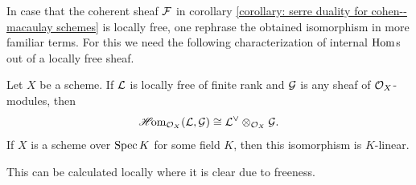 In case that the coherent sheaf ${\mathcal{F}}$ in corollary \ref{corollary: serre duality for cohen--macaulay schemes} is locally free, one rephrase the obtained isomorphism in more familiar terms. For this we need the following characterization of internal ${\operatorname{Hom}}$s out of a locally free sheaf.
\begin{lemma}
\label{lemma: sheaf hom for vector bundles}

Let $X$ be a scheme. If ${\mathcal{L}}$ is locally free of finite rank and ${\mathcal{G}}$ is any sheaf of ${{\mathcal{O}}_{X}}$-modules, then
$${\operatorname{\mathscr{H}\!om}}_{{{\mathcal{O}}_{X}}}({\mathcal{L}}, {\mathcal{G}}) \cong {\mathcal{L}}^\vee \otimes_{{{\mathcal{O}}_{X}}} {\mathcal{G}}.$$
If $X$ is a scheme over $\operatorname{Spec} K$ for some field $K$, then this isomorphism is $K$-linear.
\end{lemma}
\begin{shortproof}
This can be calculated locally where it is clear due to freeness.
\end{shortproof}

